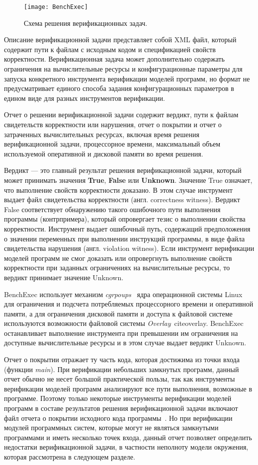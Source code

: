 \begin{figure}
\centering
\texttt{[image: BenchExec]}
\caption{Схема решения верификационных задач.}
\label{figure:benchexec}
\end{figure}

Описание верификационной задачи представляет собой XML файл, который содержит пути к файлам с исходным кодом и спецификацией свойств корректности.
Верификационная задача может дополнительно содержать ограничения на вычислительные ресурсы и конфигурационные параметры для запуска конкретного инструмента верификации моделей программ, но формат не предусматривает единого способа задания конфигурационных параметров в едином виде для разных инструментов верификации.

Отчет о решении верификационной задачи содержит вердикт, пути к файлам свидетельств корректности или нарушения, отчет о покрытии и отчет о затраченных вычислительных ресурсах, включая время решения верификационной задачи, процессорное времени, максимальный объем используемой оперативной и дисковой памяти во время решения.

Вердикт --- это главный результат решения верификационной задачи, который может принимать значения \textbf{True}, \textbf{False} или \textbf{Unknown}.
Значение True означает, что выполнение свойств корректности доказано.
В этом случае инструмент выдает файл свидетельства корректности (англ. correctness witness).
Вердикт False соответствует обнаружению такого ошибочного пути выполнения программы (контрпримера), который опровергает тезис о выполнении свойства корректности.
Инструмент выдает ошибочный путь, содержащий предположения о значении переменных при выполнении инструкций программы, в виде файла свидетельства нарушения (англ. violation witness).
Если инструмент верификации моделей программ не смог доказать или опровергнуть выполнение свойств корректности при заданных ограничениях на вычислительные ресурсы, то вердикт принимает значение Unknown.

BenchExec использует механизм \textit{cgrpoups}~\cite{cgroups} ядра операционной системы Linux для ограничения и подсчета потребляемых процессорного времени и оперативной памяти, а для ограничения дисковой памяти и доступа к файловой системе используются возможности файловой системы \textit{Overlay}~cite{overlay}.
BenchExec останавливает выполнение инструмента при превышении им ограничения на доступные вычислительные ресурсы и в этом случае выдает вердикт Unknown.

Отчет о покрытии отражает ту часть кода, которая достижима из точки входа (функции \textit{main}).
При верификации небольших замкнутых программ, данный отчет обычно не несет большой практической пользы, так как инструменты верификации моделей программ анализируют все пути выполнения, возможные в программе.
Поэтому только некоторые инструменты верификации моделей программ в составе результатов решения верификационной задачи включают файл отчета о покрытии исходного кода программы~\cite{verificationcov}.
Но при верификации модулей программных систем, которые могут не являться замкнутыми программами и иметь несколько точек входа, данный отчет позволяет определить недостатки верификационной задачи, в частности неполноту модели окружения, которая рассмотрена в следующем разделе.

